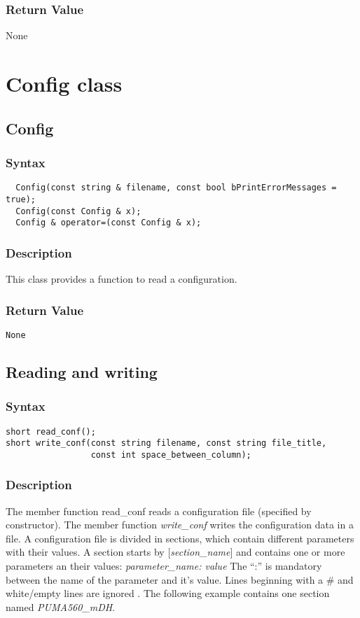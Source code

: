 \documentclass[dvips,11pt,fleqn]{report}
\begin{document}
\subsubsection*{Return Value}

None

\newpage

\section{Config class}
\subsection*{Config}
 \subsubsection*{Syntax}
 \begin{verbatim}
  Config(const string & filename, const bool bPrintErrorMessages = true);
  Config(const Config & x);
  Config & operator=(const Config & x);
 \end{verbatim}

\subsubsection*{Description}   
This class provides a function to read a configuration. 

\subsubsection*{Return Value}

{\tt None}
 \newpage 

\subsection*{Reading and writing}
\subsubsection*{Syntax}
\begin{verbatim}
short read_conf();
short write_conf(const string filename, const string file_title,
                 const int space_between_column);
\end{verbatim}

\subsubsection*{Description}   
The member function read\_conf reads a configuration file (specified
by constructor). The member function \emph{write\_conf} writes the
configuration data in a file. A configuration file is divided in
sections, which contain different parameters with their values. A
section starts by $[$\emph{section\_name}$]$ and contains one or more
parameters an their values: \emph{parameter\_name: value} The ``:'' is
mandatory between the name of the parameter and it's value. Lines
beginning with a \# and white/empty lines are ignored .  The following
example contains one section named \emph{PUMA560\_mDH}.
\end{document}
